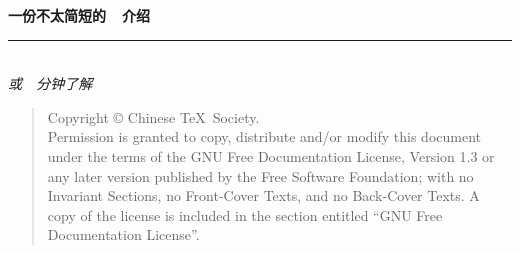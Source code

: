 \thispagestyle{empty}

\noindent\begin{minipage}{\textwidth}
\raggedleft
{\huge \bfseries 一份不太简短的~\LaTeXe{}~介绍}
\noindent\rule[-1ex]{\textwidth}{5pt}\\[2.5ex]
\hfill\emph{\Large 或~\pageref{lshort-minutes}~分钟了解~\LaTeXe}
\end{minipage}

\noindent{}


\newpage\thispagestyle{empty}
\begin{quote}\footnotesize
    Copyright \copyright{} {\the\year} Chinese \TeX\ Society. \\
    Permission is granted to copy, distribute and/or modify this document
    under the terms of the GNU Free Documentation License, Version 1.3
    or any later version published by the Free Software Foundation;
    with no Invariant Sections, no Front-Cover Texts, and no Back-Cover Texts.
    A copy of the license is included in the section entitled ``GNU
    Free Documentation License''.
\end{quote}